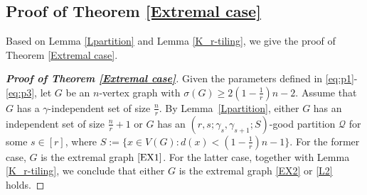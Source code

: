 \documentclass[11pt, a4paper]{article}
\theoremstyle{definition}
\newcommand{\<}{\subseteq}
\begin{document}
\subsection{Proof of Theorem \ref{Extremal case}}\label{section5.3}


Based on Lemma \ref{Lpartition} and Lemma \ref{K_r-tiling}, we give the proof of Theorem \ref{Extremal case}. 


\begin{proof}[\bf Proof of Theorem \ref{Extremal case}]
Given the parameters defined in \eqref{eq:p1}-\eqref{eq:p3}, let $G$ be an $n$-vertex graph with $\sigma(G)\ge 2(1-\frac{1}{r})n-2$. Assume that $G$ has a $\gamma$-independent set of size $\frac{n}{r}$. By Lemma~\ref{Lpartition}, either $G$ has an independent set of size $\frac{n}{r}+1$ or $G$ has  an $(r,s;\gamma_s,\gamma_{s+1};S)$-good partition $\mathcal{Q}$ for some $s\in[r]$, where $S:=\{x\in V(G):d(x)<(1-\frac{1}{r})n-1\}$. For the former case, $G$ is the extremal graph $\ref{EX1}$. For the latter case, together with Lemma \ref{K_r-tiling}, we conclude that either $G$ is the extremal graph  \ref{EX2} or \ref{L2} holds.


\end{proof}
\end{document}
